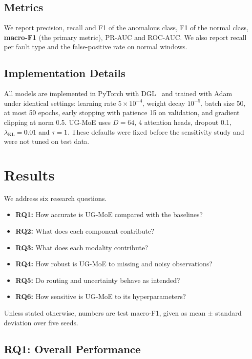 \documentclass[journal]{IEEEtran}
\newcommand{\ugmoe}{UG-MoE}
\begin{document}
\subsection{Metrics}
We report precision, recall and F1 of the anomalous class, F1 of the normal class, \textbf{macro-F1} (the
primary metric), PR-AUC and ROC-AUC. We also report recall per fault type and the false-positive rate on
normal windows.

\subsection{Implementation Details}
All models are implemented in PyTorch with DGL~\cite{wang2019dgl} and trained with Adam~\cite{kingma2015adam}
under identical settings: learning rate $5\times10^{-4}$, weight decay $10^{-5}$, batch size 50, at most 50
epochs, early stopping with patience 15 on validation, and gradient clipping at norm 0.5. \ugmoe{} uses $D=64$,
4 attention heads, dropout 0.1, $\lambda_{\mathrm{KL}}=0.01$ and $\tau=1$. These defaults were fixed before the
sensitivity study and were not tuned on test data.

\section{Results}
\label{sec:results}

We address six research questions.
\begin{itemize}
  \item \textbf{RQ1:} How accurate is \ugmoe{} compared with the baselines?
  \item \textbf{RQ2:} What does each component contribute?
  \item \textbf{RQ3:} What does each modality contribute?
  \item \textbf{RQ4:} How robust is \ugmoe{} to missing and noisy observations?
  \item \textbf{RQ5:} Do routing and uncertainty behave as intended?
  \item \textbf{RQ6:} How sensitive is \ugmoe{} to its hyperparameters?
\end{itemize}
Unless stated otherwise, numbers are test macro-F1, given as mean $\pm$ standard deviation over five seeds.

\subsection{RQ1: Overall Performance}
\end{document}
